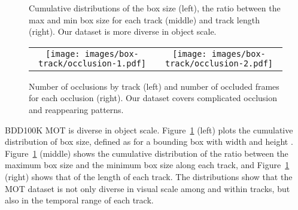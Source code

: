 \begin{figure}[tp]
    \centering
    \vspace{4mm}
    \setlength{\tabcolsep}{1pt}
    \caption{\small Cumulative distributions of the box size (left), the ratio between the max and min box size for each track (middle) and track length (right). Our dataset is more diverse in object scale.\vspace{-1mm}}
    \label{fig:mot-track}
\end{figure}

\begin{figure}[htp]
    \vspace{-2mm}

    \centering
    \setlength{\tabcolsep}{1pt}

    \begin{tabular}{cc}
        \texttt{[image: images/box-track/occlusion-1.pdf]} & \hspace{3mm}
        \texttt{[image: images/box-track/occlusion-2.pdf]} \\
    \end{tabular}
    \vspace{-2mm}
    \caption{\small Number of occlusions by track (left) and number of occluded frames for each occlusion (right).  Our dataset covers complicated occlusion and reappearing patterns. \vspace{-2mm}}
    \label{fig:mot-occlusion}
    
\end{figure}

BDD100K MOT is diverse in object scale. Figure~\ref{fig:mot-track} (left) plots the cumulative distribution of box size, defined as  for a bounding box with width  and height . Figure~\ref{fig:mot-track} (middle) shows the cumulative distribution of the ratio between the maximum box size and the minimum box size along each track, and  Figure~\ref{fig:mot-track} (right) shows that of the length of each track. The distributions show that the MOT dataset is not only diverse in visual scale among and within tracks, but also in the temporal range of each track.

